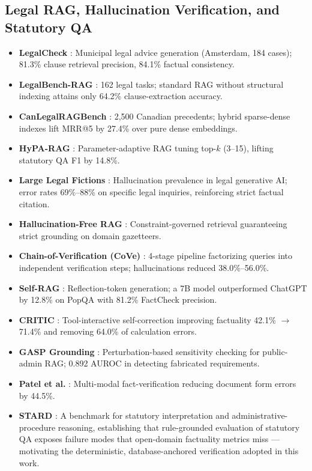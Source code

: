 \documentclass[11pt,a4paper]{article}
\begin{document}
\subsection{Legal RAG, Hallucination Verification, and Statutory QA}
\begin{itemize}
\item \textbf{LegalCheck} \cite{legalcheck}: Municipal legal advice generation (Amsterdam, 184 cases);
81.3\% clause retrieval precision, 84.1\% factual consistency.
\item \textbf{LegalBench-RAG} \cite{legalbenchrag}: 162 legal tasks; standard RAG without structural
indexing attains only 64.2\% clause-extraction accuracy.
\item \textbf{CanLegalRAGBench} \cite{canlegalragbench}: 2,500 Canadian precedents; hybrid sparse-dense
indexes lift MRR@5 by 27.4\% over pure dense embeddings.
\item \textbf{HyPA-RAG} \cite{hyparag}: Parameter-adaptive RAG tuning top-$k$ (3--15), lifting statutory
QA F1 by 14.8\%.
\item \textbf{Large Legal Fictions} \cite{largelegalfictions}: Hallucination prevalence in legal
generative AI; error rates 69\%--88\% on specific legal inquiries, reinforcing strict factual citation.
\item \textbf{Hallucination-Free RAG} \cite{hallucfree}: Constraint-governed retrieval guaranteeing
strict grounding on domain gazetteers.
\item \textbf{Chain-of-Verification (CoVe)} \cite{cove}: 4-stage pipeline factorizing queries into
independent verification steps; hallucinations reduced 38.0\%--56.0\%.
\item \textbf{Self-RAG} \cite{selfrag}: Reflection-token generation; a 7B model outperformed ChatGPT by
12.8\% on PopQA with 81.2\% FactCheck precision.
\item \textbf{CRITIC} \cite{critic}: Tool-interactive self-correction improving factuality 42.1\%
$\rightarrow$ 71.4\% and removing 64.0\% of calculation errors.
\item \textbf{GASP Grounding} \cite{gasp}: Perturbation-based sensitivity checking for public-admin RAG;
0.892 AUROC in detecting fabricated requirements.
\item \textbf{Patel et al.} \cite{patel}: Multi-modal fact-verification reducing document form errors
by 44.5\%.
\item \textbf{STARD} \cite{stard}: A benchmark for statutory interpretation and administrative-procedure
reasoning, establishing that rule-grounded evaluation of statutory QA exposes failure modes that
open-domain factuality metrics miss --- motivating the deterministic, database-anchored verification
adopted in this work.
\end{itemize}
\end{document}
